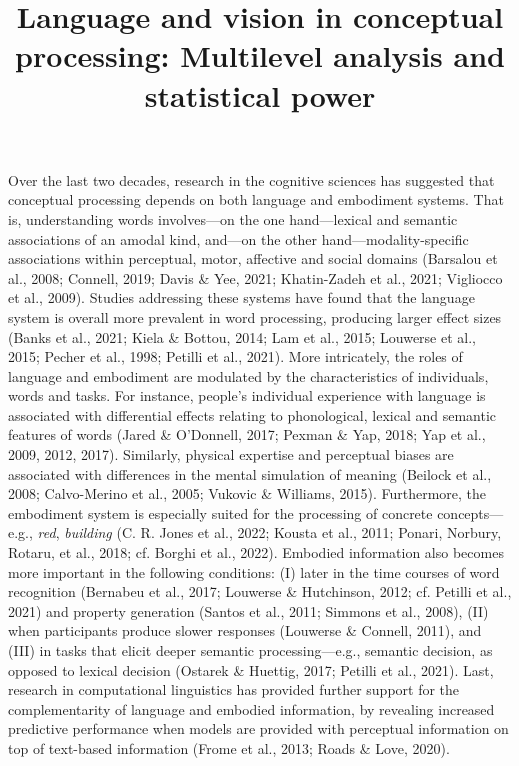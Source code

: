 \documentclass[
  12pt,
  man,floatsintext]{apa7}
\title{Language and vision in conceptual processing: Multilevel analysis and statistical power}
\author{\phantom{0}}
\date{}
\affiliation{\phantom{0}}
\begin{document}
\maketitle

\hypertarget{section}{%
\section{}\label{section}}

Over the last two decades, research in the cognitive sciences has suggested that conceptual processing depends on both language and embodiment systems. That is, understanding words involves---on the one hand---lexical and semantic associations of an amodal kind, and---on the other hand---modality-specific associations within perceptual, motor, affective and social domains (Barsalou et al., 2008; Connell, 2019; Davis \& Yee, 2021; Khatin-Zadeh et al., 2021; Vigliocco et al., 2009). Studies addressing these systems have found that the language system is overall more prevalent in word processing, producing larger effect sizes (Banks et al., 2021; Kiela \& Bottou, 2014; Lam et al., 2015; Louwerse et al., 2015; Pecher et al., 1998; Petilli et al., 2021). More intricately, the roles of language and embodiment are modulated by the characteristics of individuals, words and tasks. For instance, people's individual experience with language is associated with differential effects relating to phonological, lexical and semantic features of words (Jared \& O'Donnell, 2017; Pexman \& Yap, 2018; Yap et al., 2009, 2012, 2017). Similarly, physical expertise and perceptual biases are associated with differences in the mental simulation of meaning (Beilock et al., 2008; Calvo-Merino et al., 2005; Vukovic \& Williams, 2015). Furthermore, the embodiment system is especially suited for the processing of concrete concepts---e.g., \emph{red}, \emph{building} (C. R. Jones et al., 2022; Kousta et al., 2011; Ponari, Norbury, Rotaru, et al., 2018; cf. Borghi et al., 2022). Embodied information also becomes more important in the following conditions: (I) later in the time courses of word recognition (Bernabeu et al., 2017; Louwerse \& Hutchinson, 2012; cf. Petilli et al., 2021) and property generation (Santos et al., 2011; Simmons et al., 2008), (II) when participants produce slower responses (Louwerse \& Connell, 2011), and (III) in tasks that elicit deeper semantic processing---e.g., semantic decision, as opposed to lexical decision (Ostarek \& Huettig, 2017; Petilli et al., 2021). Last, research in computational linguistics has provided further support for the complementarity of language and embodied information, by revealing increased predictive performance when models are provided with perceptual information on top of text-based information (Frome et al., 2013; Roads \& Love, 2020).
\end{document}
